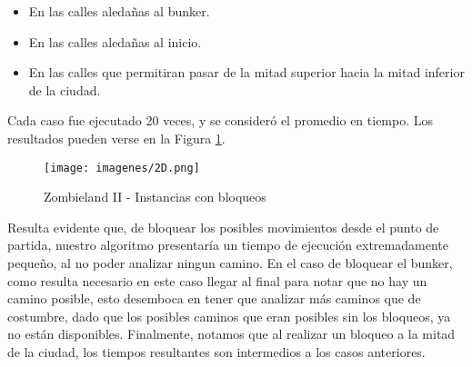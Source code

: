 \begin{itemize}
	\item En las calles aledañas al bunker.
	\item En las calles aledañas al inicio.
	\item En las calles que permitiran pasar de la mitad superior hacia la mitad inferior de la ciudad.
\end{itemize}

Cada caso fue ejecutado 20 veces, y se consideró el promedio en tiempo.  Los resultados pueden verse en la Figura \ref{fig:2C}.

\begin{figure}[htb]
	\begin{center}
    		\texttt{[image: imagenes/2D.png]}
	\end{center}
	\caption{Zombieland II - Instancias con bloqueos}\label{fig:2C}
\end{figure}

Resulta evidente que, de bloquear los posibles movimientos desde el punto de partida, nuestro algoritmo presentaría un tiempo de ejecución extremadamente pequeño, al no poder analizar ningun camino. En el caso de bloquear el bunker, como resulta necesario en este caso llegar al final para notar que no hay un camino posible, esto desemboca en tener que analizar más caminos que de costumbre, dado que los posibles caminos que eran posibles sin los bloqueos, ya no están disponibles.  Finalmente, notamos que al realizar un bloqueo a la mitad de la ciudad, los tiempos resultantes son intermedios a los casos anteriores.

\newpage